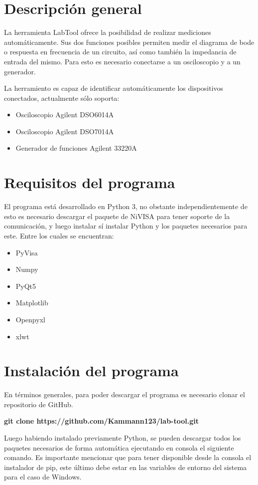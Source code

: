 \section{Descripci\'on general}
La herramienta LabTool ofrece la posibilidad de realizar mediciones autom\'aticamente. Sus dos funciones posibles permiten medir
el diagrama de bode o respuesta en frecuencia de un circuito, as\'i como tambi\'en la impedancia de entrada del mismo. Para esto
es necesario conectarse a un osciloscopio y a un generador.

La herramiento es capaz de identificar autom\'aticamente los dispositivos conectados, actualmente s\'olo soporta:
\begin{itemize}
    \item Osciloscopio Agilent DSO6014A
    \item Osciloscopio Agilent DSO7014A
    \item Generador de funciones Agilent 33220A
\end{itemize}

\section{Requisitos del programa}
El programa est\'a desarrollado en Python 3, no obstante independientemente de esto es necesario descargar el paquete de NiVISA
para tener soporte de la comunicaci\'on, y luego instalar s\'i instalar Python y los paquetes necesarios para este. Entre los cuales se encuentran:
\begin{itemize}
    \item PyVisa
    \item Numpy
    \item PyQt5
    \item Matplotlib
    \item Openpyxl
    \item xlwt
\end{itemize}

\section{Instalaci\'on del programa}
En t\'erminos generales, para poder descargar el programa es necesario clonar el repositorio de GitHub.

\begin{center}
    \textbf{git clone https://github.com/Kammann123/lab-tool.git}
\end{center}

Luego habiendo instalado previamente Python, se pueden descargar todos los paquetes necesarios de forma autom\'atica
ejecutando en consola el siguiente comando. Es importante mencionar que para tener disponible desde la consola el instalador de pip,
este \'ultimo debe estar en las variables de entorno del sistema para el caso de Windows.


